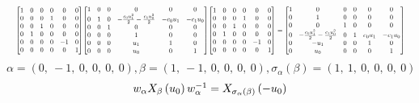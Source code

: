 \documentclass[11pt]{article}
\theoremstyle{definition}
\begin{document}
\[
\scaletoalign{\textwidth}{{\left[\begin{matrix}1 & 0 & 0 & 0 & 0 & 0\\0 & 0 & 0 & 1 & 0 & 0\\0 & 0 & 1 & 0 & 0 & 0\\0 & 1 & 0 & 0 & 0 & 0\\0 & 0 & 0 & 0 & -1 & 0\\0 & 0 & 0 & 0 & 0 & 1\end{matrix}\right]} {\left[\begin{matrix}1 & 0 & 0 & 0 & 0 & 0\\0 & 1 & 0 & - \frac{c_{0} u_{1}^{2}}{2} - \frac{c_{1} u_{0}^{2}}{2} & - c_{0} u_{1} & - c_{1} u_{0}\\0 & 0 & 1 & 0 & 0 & 0\\0 & 0 & 0 & 1 & 0 & 0\\0 & 0 & 0 & u_{1} & 1 & 0\\0 & 0 & 0 & u_{0} & 0 & 1\end{matrix}\right]} {\left[\begin{matrix}1 & 0 & 0 & 0 & 0 & 0\\0 & 0 & 0 & 1 & 0 & 0\\0 & 0 & 1 & 0 & 0 & 0\\0 & 1 & 0 & 0 & 0 & 0\\0 & 0 & 0 & 0 & -1 & 0\\0 & 0 & 0 & 0 & 0 & 1\end{matrix}\right]} = {\left[\begin{matrix}1 & 0 & 0 & 0 & 0 & 0\\0 & 1 & 0 & 0 & 0 & 0\\0 & 0 & 1 & 0 & 0 & 0\\0 & - \frac{c_{0} u_{1}^{2}}{2} - \frac{c_{1} u_{0}^{2}}{2} & 0 & 1 & c_{0} u_{1} & - c_{1} u_{0}\\0 & - u_{1} & 0 & 0 & 1 & 0\\0 & u_{0} & 0 & 0 & 0 & 1\end{matrix}\right]}}
\]
\[
\alpha = \left( 0, \  -1, \  0, \  0, \  0, \  0\right), \beta = \left( 1, \  -1, \  0, \  0, \  0, \  0\right), \sigma_{\alpha}(\beta) = \left( 1, \  1, \  0, \  0, \  0, \  0\right)
\]
\[
\scaletoalign{\textwidth}{w_{\alpha} X_{\beta}\left(u_{0}\right) w_{\alpha}^{-1} = X_{\sigma_{\alpha}\left(\beta\right)}\left(- u_{0}\right)}
\]
\end{document}
